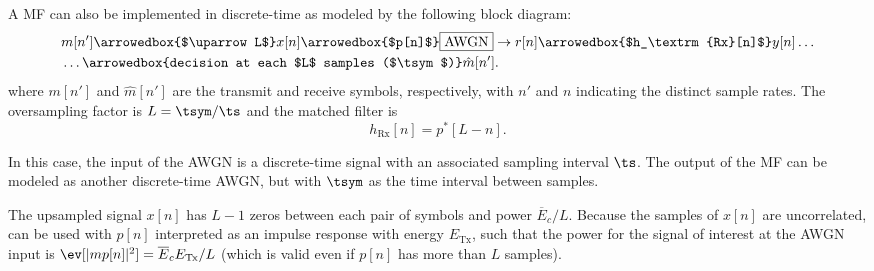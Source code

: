 A MF can also be implemented in discrete-time as modeled by the following block diagram:
\begin{align*}
&m[n'] \arrowedbox{$\uparrow L$} x[n] \arrowedbox{$p[n]$} \fbox{AWGN} \rightarrow r[n] \arrowedbox{$h_\textrm{Rx}[n]$} y[n] \ldots\\
&\ldots \arrowedbox{decision at each $L$ samples ($\tsym$)}  \hat m[n'].
\end{align*}
where $m[n']$ and $\hat m[n']$ are the transmit and receive symbols, respectively, with $n'$ and $n$ indicating the distinct sample rates.
The oversampling factor is $L=\tsym/\ts$ and the matched filter is
\[
h_\textrm{Rx}[n]=p^*[L-n].
\]

In this case, the  input of the AWGN is a discrete-time signal with an associated sampling interval $\ts$. The output of the MF can be modeled as another discrete-time AWGN, but with $\tsym$ as the time interval between samples. 

The upsampled signal $x[n]$ has $L-1$ zeros between each pair of symbols and power $\overline E_c / L$. Because the samples of $x[n]$ are uncorrelated,  can be used with $p[n]$ interpreted as an impulse response with energy $E_{\textrm{Tx}}$, such that the power for the signal of interest at the AWGN input is $\ev[|m p[n]|^2] = \overline{E}_c E_{\textrm{Tx}} / L$ (which is valid even if $p[n]$ has more than $L$ samples).


%
%

